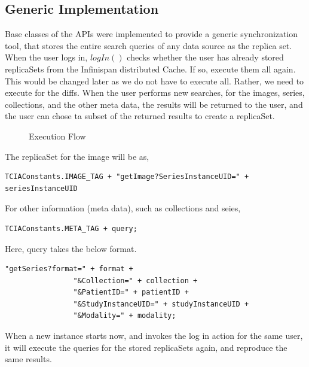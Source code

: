 \documentclass[conference]{IEEEtran}
\begin{document}
\subsection{Generic Implementation}
Base classes of the APIs were implemented to provide a generic synchronization tool, that stores the entire search queries of any data source as the replica set. When the user logs in, $logIn()$ checks whether the user has already stored replicaSets from the Infinispan distributed Cache. If so, execute them all again. This would be changed later as we do not have to execute all. Rather, we need to execute for the diffs. When the user performs new searches, for the images, series, collections, and the other meta data, the results will be returned to the user, and the user can chose ta subset of the returned results to create a replicaSet.
\begin{figure}[!htbp]
\begin{center}
\end{center}
 \caption{Execution Flow}
 \label{fig:execution}
\end{figure}
The replicaSet for the image will be as,
\begin{lstlisting}  
TCIAConstants.IMAGE_TAG + "getImage?SeriesInstanceUID=" + seriesInstanceUID
\end{lstlisting}  
For other information (meta data), such as collections and seies,
\begin{lstlisting}  
TCIAConstants.META_TAG + query;
\end{lstlisting}  

Here, query takes the below format. 
\begin{lstlisting}  
"getSeries?format=" + format +
                "&Collection=" + collection +
                "&PatientID=" + patientID +
                "&StudyInstanceUID=" + studyInstanceUID +
                "&Modality=" + modality;
\end{lstlisting}  
When a new instance starts now, and invokes the log in action for the same user, it will execute the queries for the stored replicaSets again, and reproduce the same results.
\end{document}
